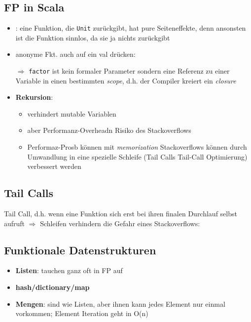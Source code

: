 \subsection{FP in Scala}
\begin{itemize}
  \item {}: eine Funktion, die \texttt{Unit} zurückgibt,
  hat pure Seiteneffekte, denn ansonsten ist die Funktion sinnlos,
  da sie ja nichts zurückgibt
  
  
  
  \item anonyme Fkt. auch auf ein val drücken:
  
  
  
  $\Rightarrow$ \texttt{factor} ist kein formaler Parameter sondern eine
  Referenz zu einer Variable in einen bestimmten \textit{scope}, d.h. 
  der Compiler kreiert ein \textit{closure}
  \item \textbf{Rekursion}:
  
  \begin{itemize}
    \item verhindert mutable Variablen
    \item aber Performanz-Overheadn \und Risiko des Stackoverflows
    \item Performaz-Prosb können mit \textit{memorization} \und 
    Stackoverflows können durch Umwandlung in eine spezielle 
    Schleife (Tail Calls \und Tail-Call Optimierung) verbessert
    werden
  \end{itemize}
\end{itemize}


\subsection{Tail Calls}
Tail Call, d.h. wenn eine Funktion sich erst bei ihren
finalen Durchlauf selbst aufruft $\Rightarrow$ Schleifen verhindern die
Gefahr eines Stackoverflows:

  


\subsection{Funktionale Datenstrukturen}
\begin{itemize}
  \item \textbf{Listen}: tauchen ganz oft in FP auf
  
  
  
  \item \textbf{hash/dictionary/map}
    
  \item \textbf{Mengen}: sind wie Listen, aber ihnen kann jedes
  Element nur einmal vorkommen; Element Iteration geht in O(n)
\end{itemize}


